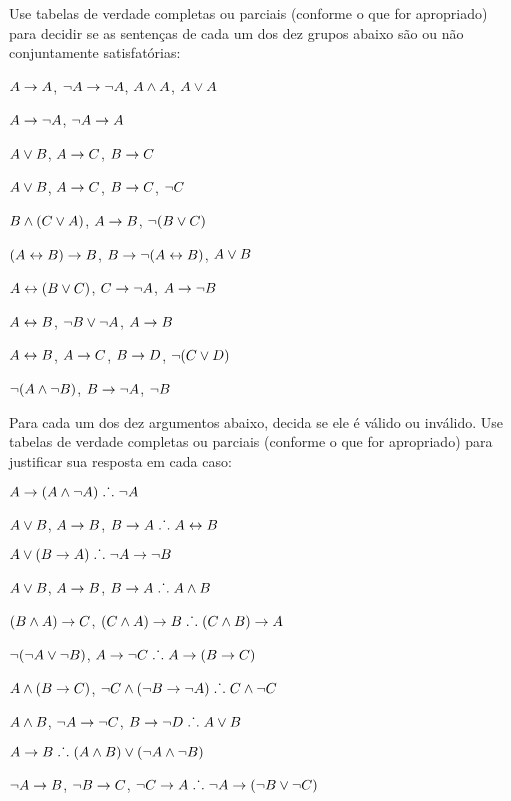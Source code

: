 \noindent\problempart
\label{pr.TT.satisfiable5}
Use tabelas de verdade completas ou parciais (conforme o que for apropriado) para decidir se as sentenças de cada um dos dez grupos abaixo são ou não conjuntamente satisfatórias:
\begin{earg}
\item $A\rightarrow A$, $\neg A \rightarrow \neg A$, $A\wedge A$, $A\vee A$ %
\item $A \rightarrow \neg A$, $\neg A \rightarrow A$%
\item $A\vee B$, $A\rightarrow C$, $B\rightarrow C$ %
\item $A \vee B$, $A \rightarrow C$, $B \rightarrow C$, $\neg C$ %
\item $B\wedge(C\vee A)$, $A\rightarrow B$, $\neg(B\vee C)$  %
\item $(A \leftrightarrow B) \rightarrow B$,  $B \rightarrow \neg (A \leftrightarrow B)$, $A \vee B$  %
\item $A\leftrightarrow(B\vee C)$, $C\rightarrow \neg A$, $A\rightarrow \neg B$ %
\item  $A \leftrightarrow B$,  $\neg B \vee \neg A$,  $A \rightarrow  B$ %
\item $A \leftrightarrow B$, $A \rightarrow C$, $B \rightarrow D$, $\neg(C \vee D)$ %
\item $\neg (A \wedge \neg B)$,  $B \rightarrow \neg A$, $\neg B$   %
\end{earg}

\noindent\problempart 
Para cada um dos dez argumentos abaixo, decida se ele é válido ou inválido.
Use tabelas de verdade completas ou parciais (conforme o que for apropriado) para justificar sua resposta em cada caso:
\label{pr.TT.valid5} 
\begin{earg}
\item $A\rightarrow(A\wedge\neg A)\mathrel{\ldotp\dot{}\,\ldotp} \neg A$%
\item $A \vee B$, $A \rightarrow B$, $B \rightarrow A \mathrel{\ldotp\dot{}\,\ldotp}  A \leftrightarrow B$  %
\item $A\vee(B\rightarrow A)\mathrel{\ldotp\dot{}\,\ldotp} \neg A \rightarrow \neg B$ %
\item $A \vee B$, $A \rightarrow B$, $ B \rightarrow A \mathrel{\ldotp\dot{}\,\ldotp}  A \wedge B$ %
\item $(B\wedge A)\rightarrow C$, $(C\wedge A)\rightarrow B\mathrel{\ldotp\dot{}\,\ldotp} (C\wedge B)\rightarrow A$ %
\item $\neg (\neg A \vee \neg B)$, $A \rightarrow \neg C \mathrel{\ldotp\dot{}\,\ldotp}  A \rightarrow (B \rightarrow C)$ %
\item $A \wedge (B \rightarrow C)$, $\neg C \wedge (\neg B \rightarrow \neg A)\mathrel{\ldotp\dot{}\,\ldotp} C \wedge \neg C$ %
\item $A \wedge B$, $\neg A \rightarrow \neg C$, $B \rightarrow \neg D \mathrel{\ldotp\dot{}\,\ldotp}  A \vee B$ %
\item $A \rightarrow B\mathrel{\ldotp\dot{}\,\ldotp} (A \wedge B) \vee (\neg A \wedge \neg B)$ %
\item $\neg A \rightarrow B$, $ \neg B \rightarrow C $, $ \neg C \rightarrow A \mathrel{\ldotp\dot{}\,\ldotp}  \neg A \rightarrow (\neg B \vee \neg C) $%

\end{earg}

